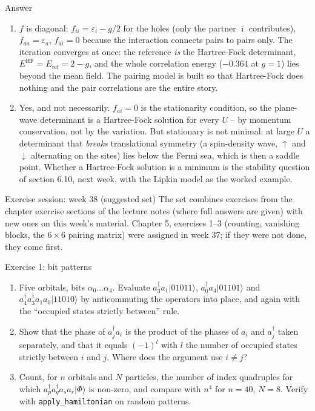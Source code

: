 \documentclass[aspectratio=169,10pt]{beamer}
\newcounter{thinkctr}
\newcommand{\thinka}[1]{%
  \begin{tcolorbox}[colback=paleteal,colframe=teal,title={\bfseries Answer to pause \#\thethinkctr}]
  #1
  \end{tcolorbox}}
\newcommand{\ket}[1]{\vert #1\rangle}
\begin{document}
\begin{frame}{Answer}
  \thinka{
  \begin{enumerate}
    \item $f$ is diagonal: $f_{ii}=\varepsilon_i-g/2$ for the holes (only the partner $\bar\imath$ contributes), $f_{aa}=\varepsilon_a$, $f_{ai}=0$ because the interaction connects pairs to pairs only. The iteration converges at once: the reference \emph{is} the Hartree-Fock determinant, $E^{\mathrm{HF}}=E_{\mathrm{ref}}=2-g$, and the whole correlation energy ($-0.364$ at $g=1$) lies beyond the mean field. The pairing model is built so that Hartree-Fock does nothing and the pair correlations are the entire story.
    \item Yes, and not necessarily. $f_{ai}=0$ is the stationarity condition, so the plane-wave determinant is a Hartree-Fock solution for every $U$ -- by momentum conservation, not by the variation. But stationary is not minimal: at large $U$ a determinant that \emph{breaks} translational symmetry (a spin-density wave, $\uparrow$ and $\downarrow$ alternating on the sites) lies below the Fermi sea, which is then a saddle point. Whether a Hartree-Fock solution is a minimum is the stability question of section 6.10, next week, with the Lipkin model as the worked example.
    \end{enumerate}}
\end{frame}

\begin{frame}{Exercise session: week 38 (suggested set)}
  \footnotesize
  The set combines exercises from the chapter exercise sections of the lecture notes (where full answers are given) with new ones on this week's material. Chapter 5, exercises 1--3 (counting, vanishing blocks, the $6\times6$ pairing matrix) were assigned in week 37; if they were not done, they come first.
  \begin{block}{Exercise 1: bit patterns}
    \begin{enumerate}
      \item[a)] Five orbitals, bits $\alpha_0\dots\alpha_4$. Evaluate $a_3^{\dagger}a_1\ket{01011}$, $a_0^{\dagger}a_4\ket{01101}$ and $a_4^{\dagger}a_3^{\dagger}a_1a_0\ket{11010}$ by anticommuting the operators into place, and again with the ``occupied states strictly between'' rule.
      \item[b)] Show that the phase of $a_j^{\dagger}a_i$ is the product of the phases of $a_i$ and $a_j^{\dagger}$ taken separately, and that it equals $(-1)^{l}$ with $l$ the number of occupied states strictly between $i$ and $j$. Where does the argument use $i\neq j$?
      \item[c)] Count, for $n$ orbitals and $N$ particles, the number of index quadruples for which $a_p^{\dagger}a_q^{\dagger}a_sa_r\ket{\Phi}$ is non-zero, and compare with $n^4$ for $n=40$, $N=8$. Verify with \texttt{apply\_hamiltonian} on random patterns.
    \end{enumerate}
  \end{block}
\end{frame}
\end{document}

